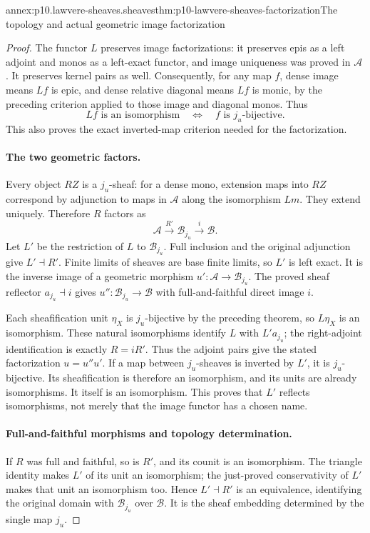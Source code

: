 \begin{annexitem}{annex:p10.lawvere-sheaves.sheaves}{thm:p10-lawvere-sheaves-factorization}{The topology and actual geometric image factorization}
\begin{proof}
The functor \(L\) preserves image factorizations:
it preserves epis as a left adjoint and monos as
a left-exact functor, and image uniqueness was
proved in \(\mathcal A\).  It preserves kernel
pairs as well.  Consequently, for any map \(f\),
dense image means \(Lf\) is epic, and dense
relative diagonal means \(Lf\) is monic, by
the preceding criterion applied to those image
and diagonal monos.  Thus
\[
          Lf\text{ is an isomorphism}
                    \quad\Longleftrightarrow\quad
                           f\text{ is }j_u\text{-bijective}.
\]
This also proves the exact inverted-map criterion
needed for the factorization.

\paragraph{The two geometric factors.}
Every object \(RZ\) is a \(j_u\)-sheaf: for a
dense mono, extension maps into \(RZ\) correspond
by adjunction to maps in \(\mathcal A\) along
the isomorphism \(Lm\).  They extend uniquely.
Therefore \(R\) factors as
\[
           \mathcal A\xrightarrow{R'}\mathcal B_{j_u}
                                      \xrightarrow{i}\mathcal B.
\]
Let \(L'\) be the restriction of \(L\) to
\(\mathcal B_{j_u}\).  Full inclusion and the
original adjunction give \(L'\dashv R'\).
Finite limits of sheaves are base finite limits,
so \(L'\) is left exact.  It is the inverse
image of a geometric morphism
\(u':\mathcal A\to\mathcal B_{j_u}\).
The proved sheaf reflector \(a_{j_u}\dashv i\)
gives \(u'':\mathcal B_{j_u}\to\mathcal B\)
with full-and-faithful direct image \(i\).

Each sheafification unit \(\eta_X\) is
\(j_u\)-bijective by the preceding theorem,
so \(L\eta_X\) is an isomorphism.  These
natural isomorphisms identify \(L\) with
\(L'a_{j_u}\); the right-adjoint identification
is exactly \(R=iR'\).  Thus the adjoint pairs
give the stated factorization \(u=u''u'\).
If a map between \(j_u\)-sheaves is inverted
by \(L'\), it is \(j_u\)-bijective.  Its
sheafification is therefore an isomorphism,
and its units are already isomorphisms.  It
itself is an isomorphism.  This proves that
\(L'\) reflects isomorphisms, not merely that
the image functor has a chosen name.

\paragraph{Full-and-faithful morphisms and topology determination.}
If \(R\) was full and faithful, so is \(R'\),
and its counit is an isomorphism.  The triangle
identity makes \(L'\) of its unit an isomorphism;
the just-proved conservativity of \(L'\) makes
that unit an isomorphism too.  Hence
\(L'\dashv R'\) is an equivalence, identifying
the original domain with \(\mathcal B_{j_u}\)
over \(\mathcal B\).  It is the sheaf embedding
determined by the single map \(j_u\).


\end{proof}
\end{annexitem}
